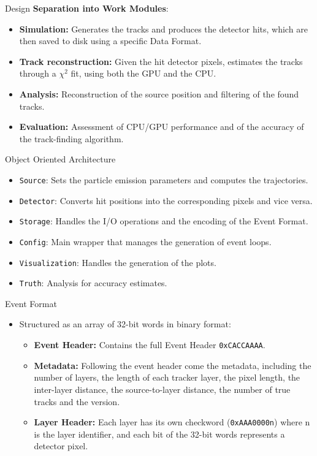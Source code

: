 \documentclass{beamer}
\begin{document}
\begin{frame}{Design}
\textbf{Separation into Work Modules}:
    \begin{itemize}
        \item \textbf{Simulation:} Generates the tracks and produces the detector hits, which are then saved to disk using a specific Data Format.
        \item \textbf{Track reconstruction:} Given the hit detector pixels, estimates the tracks through a $\chi^2$ fit, using both the GPU and the CPU.
        \item \textbf{Analysis:} Reconstruction of the source position and filtering of the found tracks.
        \item \textbf{Evaluation:} Assessment of CPU/GPU performance and of the accuracy of the track-finding algorithm.
    \end{itemize}
\end{frame}

\begin{frame}{Object Oriented Architecture}
     \begin{itemize}
        \item \texttt{Source}: Sets the particle emission parameters and computes the trajectories.
        \item \texttt{Detector}: Converts hit positions into the corresponding pixels and vice versa.
        \item \texttt{Storage}: Handles the I/O operations and the encoding of the Event Format.
        \item \texttt{Config}: Main wrapper that manages the generation of event loops.
        \item \texttt{Visualization}: Handles the generation of the plots.
        \item \texttt{Truth}: Analysis for accuracy estimates.
    \end{itemize}
\end{frame}

\begin{frame}{Event Format}
\begin{itemize}
    \item Structured as an array of 32-bit words in binary format:
    \begin{itemize}
        \item \textbf{Event Header:} Contains the full Event Header \texttt{0xCACCAAAA}.
        \item \textbf{Metadata:} Following the event header come the metadata, including the number of layers, the length of each tracker layer, the pixel length, the inter-layer distance, the source-to-layer distance, the number of true tracks and the version.
        \item \textbf{Layer Header:} Each layer has its own checkword (\texttt{0xAAA0000n}) where n is the layer identifier, and each bit of the 32-bit words represents a detector pixel.
    \end{itemize}
\end{itemize}
\end{frame}
\end{document}

